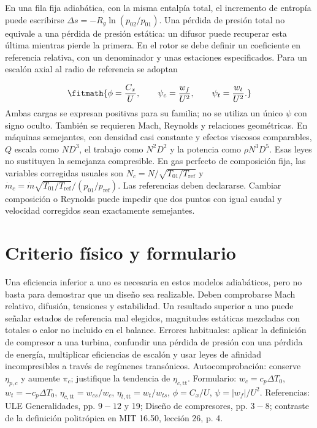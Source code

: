 \documentclass[10pt,openany]{book}
\begin{document}
En una fila fija adiabática, con la misma entalpía total, el incremento de entropía puede escribirse \(\Delta s=-R_g\ln(p_{02}/p_{01})\). Una pérdida de presión total no equivale a una pérdida de presión estática: un difusor puede recuperar esta última mientras pierde la primera. En el rotor se debe definir un coeficiente en referencia relativa, con un denominador y unas estaciones especificados.
Para un escalón axial al radio de referencia se adoptan

\[
\fitmath{\phi=\frac{C_x}{U},\qquad \psi_c=\frac{w_f}{U^2},\qquad \psi_t=\frac{w_t}{U^2}.}
\]
Ambas cargas se expresan positivas para su familia; no se utiliza un único \(\psi\) con signo oculto. También se requieren Mach, Reynolds y relaciones geométricas. En máquinas semejantes, con densidad casi constante y efectos viscosos comparables, \(Q\) escala como \(ND^3\), el trabajo como \(N^2D^2\) y la potencia como \(\rho N^3D^5\). Esas leyes no sustituyen la semejanza compresible.
En gas perfecto de composición fija, las variables corregidas usuales son \(N_c=N/\sqrt{T_{01}/T_{\mathrm{ref}}}\) y \(\dot m_c=\dot m\sqrt{T_{01}/T_{\mathrm{ref}}}/(p_{01}/p_{\mathrm{ref}})\). Las referencias deben declararse. Cambiar composición o Reynolds puede impedir que dos puntos con igual caudal y velocidad corregidos sean exactamente semejantes.

\section{Criterio físico y formulario}

Una eficiencia inferior a uno es necesaria en estos modelos adiabáticos, pero no basta para demostrar que un diseño sea realizable. Deben comprobarse Mach relativo, difusión, tensiones y estabilidad. Un resultado superior a uno puede señalar estados de referencia mal elegidos, magnitudes estáticas mezcladas con totales o calor no incluido en el balance.
Errores habituales: aplicar la definición de compresor a una turbina, confundir una pérdida de presión con una pérdida de energía, multiplicar eficiencias de escalón y usar leyes de afinidad incompresibles a través de regímenes transónicos. Autocomprobación: conserve \(\eta_{p,c}\) y aumente \(\pi_c\); justifique la tendencia de \(\eta_{c,\mathrm{tt}}\).
Formulario: \(w_c=c_p\Delta T_0\), \(w_t=-c_p\Delta T_0\), \(\eta_{c,\mathrm{tt}}=w_{cs}/w_c\), \(\eta_{t,\mathrm{tt}}=w_t/w_{ts}\), \(\phi=C_x/U\), \(\psi=|w_f|/U^2\). Referencias: ULE Generalidades, pp. \(9-12\) y 19; Diseño de compresores, pp. \(3-8\); contraste de la definición politrópica en MIT 16.50, lección 26, p. 4.
\end{document}
